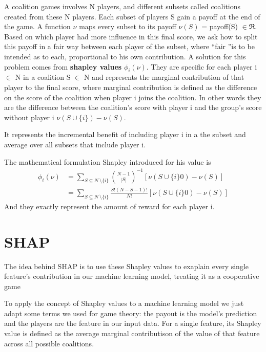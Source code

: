 \documentclass[11pt]{report}
\begin{document}
A coalition games involves N players, and different subsets called coalitions created from these N players.
Each subset of players S gain a payoff at the end of the game.
A function $\nu$ maps every subset to its payoff $\nu(S)$ = payoff(S) $\in \Re$.
Based on which player had more influence in this final score, we ask how to split this payoff in a fair way between each player of the subset, where \textquotedblleft fair \textquotedblright is to be intended as to each, proportional to his own contribution.
A solution for this problem comes from \textbf{shapley values} $\phi_i(\nu)$.
They are specific for each player i $\in$ N in a coalition S $\in$ N and represents the marginal contribution of that player to the final score, where marginal contribution is defined as the difference on the score of the coalition when player i joins the coalition.
In other words they are the difference between the coalition's score with player i and the group's score without player i $\nu (S \cup \{ i \}) - \nu(S)$.

It represents the incremental benefit of including player i in a the subset and average over all subsets that include player i.


The mathematical formulation Shapley introduced for his value is
\begin{equation}
\begin{aligned}
\phi_i(\nu)  & = \sum_{S\subseteq N\ \setminus \{ i \} }  {N- 1 \choose |S|}^{-1} [\nu (S \cup \{ i \} 0) - \nu(S)] \\
& = \sum_{S\subseteq N\ \setminus \{ i \} }  \frac{S! (N-S-1)!}{N!} [\nu (S \cup \{ i \} 0) - \nu(S) ]
\end{aligned}
\end{equation}
And they exactly represent the amount of reward for each player i.

\section{SHAP}

The idea behind SHAP is to use these Shapley values to exaplain every single feature's contribution in our machine learning model, treating it as a cooperative game

To apply the concept of Shapley values to a machine learning model we just adapt some terms we used for game theory: the payout is the model's prediction and the players are the feature in our input data.
For a single feature, its Shapley value is defined as the average marginal contributison of the value of that feature across all possible coalitions.
\end{document}
